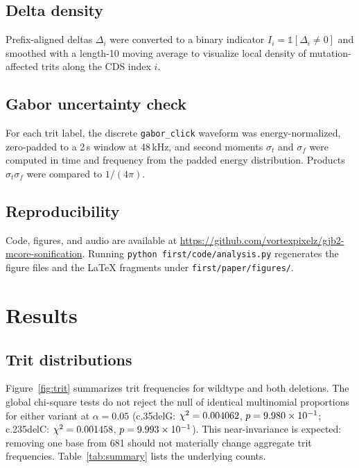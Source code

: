 \documentclass[preprint,12pt]{elsarticle}
\begin{document}
\subsection{Delta density}

Prefix-aligned deltas $\Delta_i$ were converted to a binary indicator $I_i=\mathbb{1}[\Delta_i\neq 0]$ and smoothed with a length-10 moving average to visualize local density of mutation-affected trits along the CDS index $i$.

\subsection{Gabor uncertainty check}

For each trit label, the discrete \texttt{gabor\_click} waveform was energy-normalized, zero-padded to a 2\,s window at 48\,kHz, and second moments $\sigma_t$ and $\sigma_f$ were computed in time and frequency from the padded energy distribution. Products $\sigma_t\sigma_f$ were compared to $1/(4\pi)$.

\subsection{Reproducibility}

Code, figures, and audio are available at \url{https://github.com/vortexpixelz/gjb2-mcore-sonification}. Running \texttt{python first/code/analysis.py} regenerates the figure files and the LaTeX fragments under \texttt{first/paper/figures/}.

\section{Results}

\subsection{Trit distributions}

Figure~\ref{fig:trit} summarizes trit frequencies for wildtype and both deletions. The global chi-square tests do not reject the null of identical multinomial proportions for either variant at $\alpha=0.05$ (c.35delG: $\chi^2=0.004062$, $p=9.980 \times 10^{-1}$; c.235delC: $\chi^2=0.001458$, $p=9.993 \times 10^{-1}$). This near-invariance is expected: removing one base from 681 should not materially change aggregate trit frequencies. Table~\ref{tab:summary} lists the underlying counts.
\end{document}
